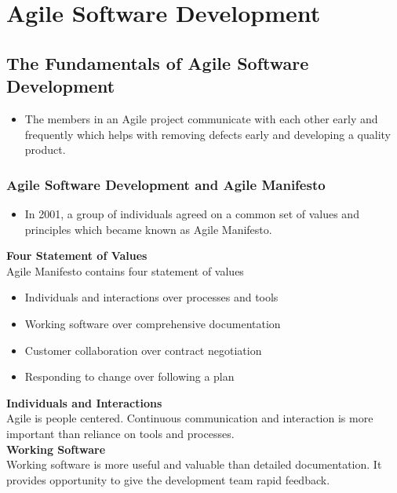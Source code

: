 \documentclass[12pt,a4paper,violet]{bbe}
\begin{document}
    	\chapter{Agile Software Development}
	\section{The Fundamentals of Agile Software Development}
	\begin{itemize}
	    \item The members in an Agile project communicate with each other early and frequently which helps with removing defects early and developing a quality product.
	\end{itemize}
	\subsection{Agile Software Development and Agile Manifesto}
	\begin{itemize}
	    \item In 2001, a group of individuals agreed on a common set of values and principles which became known as Agile Manifesto.
	\end{itemize}
		    \begin{remark}
		    \textbf{Four Statement of Values} \\
	           Agile Manifesto contains four statement of values
	            	\begin{itemize}
	                    \item Individuals and interactions over processes and tools
	                    \item Working software over comprehensive documentation
	                    \item Customer collaboration over contract negotiation
	                    \item Responding to change over following a plan
            	    \end{itemize}         
	        \end{remark}
	  \textbf{Individuals and Interactions} \\
	  Agile is people centered. Continuous communication and interaction is more important than reliance on tools and processes.\\
	  \textbf{Working Software} \\
	  Working software is more useful and valuable than detailed documentation. It provides opportunity to give the development team rapid feedback. \\
\end{document}
